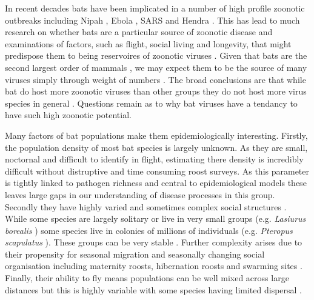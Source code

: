 In recent decades bats have been implicated in a number of high profile zoonotic outbreaks including Nipah \cite{field2001natural}, Ebola \cite{leroy2005fruit}, SARS \cite{li2005bats} and Hendra \cite{field2001natural}.
This has lead to much research on whether bats are a particular source of zoonotic disease \cite{luis2013comparison, olival2015bats, wang2011mass} and examinations of factors, such as flight, social living and longevity, that might predispose them to being reservoires of zoonotic viruses \cite{calisher2006bats, o2014bat, dobson2005links, racey2015uniqueness}.
Given that bats are the second largest order of mammals \cite{wilson2005mammal}, we may expect them to be the source of many viruses simply through weight of numbers \cite{luis2013comparison}.
The broad conclusions are that while bat do host more zoonotic viruses than other groups \cite{luis2013comparison} they do not host more virus species in general \cite{olival2015bats}.
Questions remain as to why bat viruses have a tendancy to have such high zoonotic potential.

Many factors of bat populations make them epidemiologically interesting.
Firstly, the population density of most bat species is largely unknown.
As they are small, noctornal and difficult to identify in flight, estimating there density is incredibly difficult without distruptive and time consuming roost surveys.
As this parameter is tightly linked to pathogen richness \cite{kamiya2014determines} and central to epidemiological models \cite{may1979population, anderson1979population} these leaves large gaps in our understanding of disease processes in this group.
Secondly they have highly varied and sometimes complex social structures \cite{kerth2008causes}.
While some species are largely solitary or live in very small groups (e.g. \emph{Lasiurus borealis} \cite{shump1982lasiurus}) some species live in colonies of millions of individuals (e.g. \emph{Pteropus scapulatus} \cite{birt2008little}).
These groups can be very stable \cite{kerth2011bats, mccracken1981social}.
Further complexity arises due to their propensity for seasonal migration \cite{fleming2003ecology, richter2008first, cryan2014continental} and seasonally changing social organisation including maternity roosts, hibernation roosts and swarming sites \cite{kerth2008causes}.
Finally, their ability to fly means populations can be well mixed across large distances \cite{peel2013continent, petit1999male} but this is highly variable with some species having limited dispersal \cite{wilmer1994extreme}.






